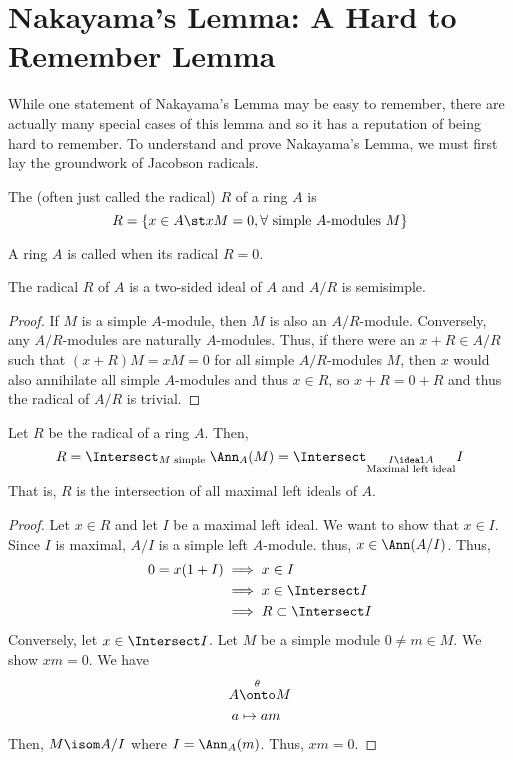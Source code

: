 \documentclass[11pt,leqno,oneside]{amsbook}
\numberwithin{thm}{section}
\begin{document}
\section{Nakayama's Lemma: A Hard to Remember Lemma}
While one statement of Nakayama's Lemma may be easy to remember, there
are actually many special cases of this lemma and so it has a
reputation of being hard to remember. To understand and prove
Nakayama's Lemma, we must first lay the groundwork of Jacobson
radicals.
\begin{defn}
  The  (often just called the radical) \(R\) of a
  ring \(A\) is \[
    R = \{x \in A \st xM = 0, \forall \text{ simple }A\text{-modules }M\}
  \]
\end{defn}
\begin{defn}
  A ring \(A\) is called  when its radical \(R = 0\). 
\end{defn}
\begin{thm}\label{radical-is-2-sided-ideal}
  The radical \(R\) of \(A\) is a two-sided ideal of \(A\) and \(A/R\)
  is semisimple.
\end{thm}
\begin{proof}
  If \(M\) is a simple \(A\)-module, then \(M\) is also an
  \(A/R\)-module. Conversely, any \(A/R\)-modules are naturally
  \(A\)-modules. Thus, if there were an \(x + R \in A/R\) such that
  \((x+R)M = xM = 
  0\) for all simple \(A/R\)-modules \(M\), then \(x\) would also
  annihilate all simple \(A\)-modules and thus \(x \in R\), so \(x+R =
  0 + R\) and thus the radical of \(A/R\) is trivial.
\end{proof}
\begin{thm}\label{radical-is-intersection-of-maxl-ideals}
  Let \(R\) be the radical of a ring \(A\). Then, \[
    R = \Intersect_{M \text{ simple }} \Ann_A (M) = \Intersect_{\substack{I
      \ideal A \\ \text{Maximal left ideal}}} I
  \]
  That is, \(R\) is the intersection of all maximal left ideals of \(A\).
\end{thm}
\begin{proof}
  Let \(x \in R\) and let \(I\) be a maximal left ideal. We want to
  show that \(x \in I\). Since \(I\) is maximal, \(A/I\) is a simple
  left \(A\)-module. thus, \(x \in \Ann(A/I)\). Thus,
  \begin{align*}
    0 = x(1+I) & \implies x \in I \\
               & \implies x \in \Intersect I \\
               & \implies R \subset \Intersect I
  \end{align*}
  Conversely, let \(x \in \Intersect I\). Let \(M\) be a simple module
  \(0 \neq m \in M\). We show \(xm = 0\). We have
  \begin{align*}
    A & \overset{\theta}{\onto} M \\
    a & \mapsto am
  \end{align*}
  Then, \(M \isom A/I\) where \(I = \Ann_A(m)\). Thus, \(xm = 0\).
\end{proof}
\end{document}
